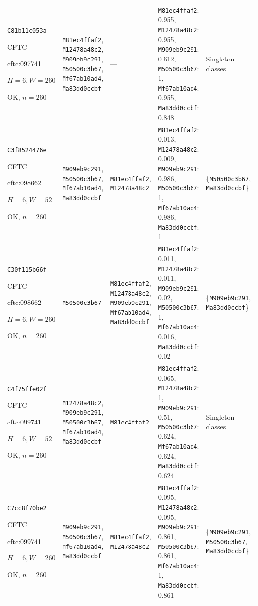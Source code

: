 \begin{longtable}{p{.15\linewidth}p{.17\linewidth}p{.17\linewidth}p{.25\linewidth}p{.14\linewidth}}
\texttt{C81b11c053a}\par CFTC\par cftc:097741\par $H=6,W=260$\par OK, $n=260$ & \texttt{M81ec4ffaf2}, \texttt{M12478a48c2}, \texttt{M909eb9c291}, \texttt{M50500c3b67}, \texttt{Mf67ab10ad4}, \texttt{Ma83dd0ccbf} & --- & \texttt{M81ec4ffaf2}: 0.955, \texttt{M12478a48c2}: 0.955, \texttt{M909eb9c291}: 0.612, \texttt{M50500c3b67}: 1, \texttt{Mf67ab10ad4}: 0.955, \texttt{Ma83dd0ccbf}: 0.848 & Singleton classes \\
\texttt{C3f8524476e}\par CFTC\par cftc:098662\par $H=6,W=52$\par OK, $n=260$ & \texttt{M909eb9c291}, \texttt{M50500c3b67}, \texttt{Mf67ab10ad4}, \texttt{Ma83dd0ccbf} & \texttt{M81ec4ffaf2}, \texttt{M12478a48c2} & \texttt{M81ec4ffaf2}: 0.013, \texttt{M12478a48c2}: 0.009, \texttt{M909eb9c291}: 0.986, \texttt{M50500c3b67}: 1, \texttt{Mf67ab10ad4}: 0.986, \texttt{Ma83dd0ccbf}: 1 & \{\texttt{M50500c3b67}, \texttt{Ma83dd0ccbf}\} \\
\texttt{C30f115b66f}\par CFTC\par cftc:098662\par $H=6,W=260$\par OK, $n=260$ & \texttt{M50500c3b67} & \texttt{M81ec4ffaf2}, \texttt{M12478a48c2}, \texttt{M909eb9c291}, \texttt{Mf67ab10ad4}, \texttt{Ma83dd0ccbf} & \texttt{M81ec4ffaf2}: 0.011, \texttt{M12478a48c2}: 0.011, \texttt{M909eb9c291}: 0.02, \texttt{M50500c3b67}: 1, \texttt{Mf67ab10ad4}: 0.016, \texttt{Ma83dd0ccbf}: 0.02 & \{\texttt{M909eb9c291}, \texttt{Ma83dd0ccbf}\} \\
\texttt{C4f75ffe02f}\par CFTC\par cftc:099741\par $H=6,W=52$\par OK, $n=260$ & \texttt{M12478a48c2}, \texttt{M909eb9c291}, \texttt{M50500c3b67}, \texttt{Mf67ab10ad4}, \texttt{Ma83dd0ccbf} & \texttt{M81ec4ffaf2} & \texttt{M81ec4ffaf2}: 0.065, \texttt{M12478a48c2}: 1, \texttt{M909eb9c291}: 0.51, \texttt{M50500c3b67}: 0.624, \texttt{Mf67ab10ad4}: 0.624, \texttt{Ma83dd0ccbf}: 0.624 & Singleton classes \\
\texttt{C7cc8f70be2}\par CFTC\par cftc:099741\par $H=6,W=260$\par OK, $n=260$ & \texttt{M909eb9c291}, \texttt{M50500c3b67}, \texttt{Mf67ab10ad4}, \texttt{Ma83dd0ccbf} & \texttt{M81ec4ffaf2}, \texttt{M12478a48c2} & \texttt{M81ec4ffaf2}: 0.095, \texttt{M12478a48c2}: 0.095, \texttt{M909eb9c291}: 0.861, \texttt{M50500c3b67}: 0.861, \texttt{Mf67ab10ad4}: 1, \texttt{Ma83dd0ccbf}: 0.861 & \{\texttt{M909eb9c291}, \texttt{M50500c3b67}, \texttt{Ma83dd0ccbf}\} \\

\end{longtable}
